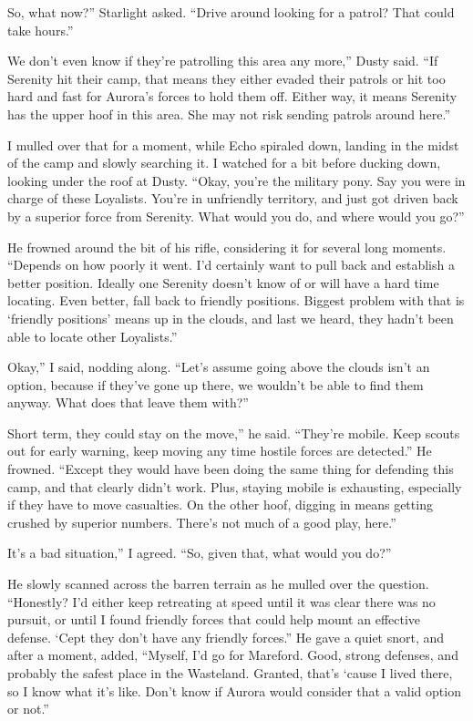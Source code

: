 \leavevmode{}So, what now?” Starlight asked. “Drive around looking for a patrol? That could take hours.”

\leavevmode{}We don’t even know if they’re patrolling this area any more,” Dusty said. “If Serenity hit their camp, that means they either evaded their patrols or hit too hard and fast for Aurora’s forces to hold them off. Either way, it means Serenity has the upper hoof in this area. She may not risk sending patrols around here.”

I mulled over that for a moment, while Echo spiraled down, landing in the midst of the camp and slowly searching it. I watched for a bit before ducking down, looking under the roof at Dusty. “Okay, you’re the military pony. Say you were in charge of these Loyalists. You’re in unfriendly territory, and just got driven back by a superior force from Serenity. What would you do, and where would you go?”

He frowned around the bit of his rifle, considering it for several long moments. “Depends on how poorly it went. I’d certainly want to pull back and establish a better position. Ideally one Serenity doesn’t know of or will have a hard time locating. Even better, fall back to friendly positions. Biggest problem with that is ‘friendly positions’ means up in the clouds, and last we heard, they hadn’t been able to locate other Loyalists.”

\leavevmode{}Okay,” I said, nodding along. “Let’s assume going above the clouds isn’t an option, because if they’ve gone up there, we wouldn’t be able to find them anyway. What does that leave them with?”

\leavevmode{}Short term, they could stay on the move,” he said. “They’re mobile. Keep scouts out for early warning, keep moving any time hostile forces are detected.” He frowned. “Except they would have been doing the same thing for defending this camp, and that clearly didn’t work. Plus, staying mobile is exhausting, especially if they have to move casualties. On the other hoof, digging in means getting crushed by superior numbers. There’s not much of a good play, here.”

\leavevmode{}It’s a bad situation,” I agreed. “So, given that, what would you do?”

He slowly scanned across the barren terrain as he mulled over the question. “Honestly? I’d either keep retreating at speed until it was clear there was no pursuit, or until I found friendly forces that could help mount an effective defense. ‘Cept they don’t have any friendly forces.” He gave a quiet snort, and after a moment, added, “Myself, I’d go for Mareford. Good, strong defenses, and probably the safest place in the Wasteland. Granted, that’s ‘cause I lived there, so I know what it’s like. Don’t know if Aurora would consider that a valid option or not.”

